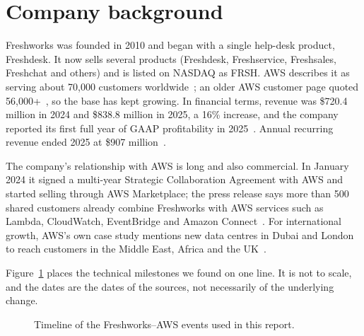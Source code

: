 \documentclass[10pt,a4paper]{article}
\begin{document}
\section{Company background}

Freshworks was founded in 2010 and began with a single help-desk product, Freshdesk. It now sells several products (Freshdesk, Freshservice, Freshsales, Freshchat and others) and is listed on NASDAQ as FRSH. AWS describes it as serving about 70{,}000 customers worldwide~\cite{gp}; an older AWS customer page quoted 56{,}000+~\cite{rdscust}, so the base has kept growing. In financial terms, revenue was \$720.4 million in 2024 and \$838.8 million in 2025, a 16\% increase, and the company reported its first full year of GAAP profitability in 2025~\cite{er25,call25}. Annual recurring revenue ended 2025 at \$907 million~\cite{call25}.

The company's relationship with AWS is long and also commercial. In January 2024 it signed a multi-year Strategic Collaboration Agreement with AWS and started selling through AWS Marketplace; the press release says more than 500 shared customers already combine Freshworks with AWS services such as Lambda, CloudWatch, EventBridge and Amazon Connect~\cite{sca}. For international growth, AWS's own case study mentions new data centres in Dubai and London to reach customers in the Middle East, Africa and the UK~\cite{gp}.

Figure~\ref{fig:timeline} places the technical milestones we found on one line. It is not to scale, and the dates are the dates of the sources, not necessarily of the underlying change.

\begin{figure}[ht]
\centering
{}
\caption{Timeline of the Freshworks--AWS events used in this report.}\label{fig:timeline}
\end{figure}
\end{document}
